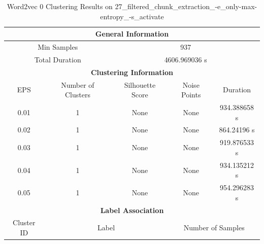 \begin{longtable}{|c|c|c|c|c|}
\caption{Word2vec 0 Clustering Results on 27\_filtered\_chunk\_extraction\_-e\_only-max-entropy\_-s\_activate} \label{tab:27_filtered_chunk_extraction_-e_only-max-entropy_-s_activate_word2vec_0_clustering_results}\\
\hline
\multicolumn{5}{|c|}{\textbf{General Information}} \\
\hline
\multicolumn{2}{|c|}{Min Samples} & \multicolumn{3}{c|}{937} \\
\multicolumn{2}{|c|}{Total Duration} & \multicolumn{3}{c|}{4606.969036 s} \\
\hline
\multicolumn{5}{|c|}{\textbf{Clustering Information}} \\
\hline
EPS & Number of Clusters & Silhouette Score & Noise Points & Duration \\
0.01 & 1 & None & None & 934.388658 s\\
0.02 & 1 & None & None & 864.24196 s\\
0.03 & 1 & None & None & 919.876533 s\\
0.04 & 1 & None & None & 934.135212 s\\
0.05 & 1 & None & None & 954.296283 s\\
\hline
\multicolumn{5}{|c|}{\textbf{Label Association}} \\
\hline
Cluster ID & \multicolumn{2}{c|}{Label} & \multicolumn{2}{c|}{Number of Samples} \\
\hline
\end{longtable}


